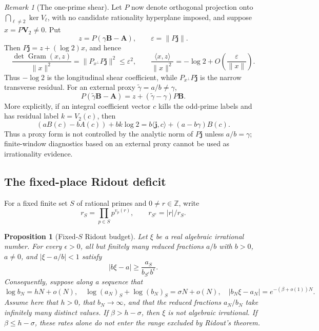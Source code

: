 \documentclass[11pt]{article}
\theoremstyle{keio}
\newtheorem{proposition}[theorem]{Proposition}
\theoremstyle{definition}
\theoremstyle{remark}
\newtheorem{remark}[theorem]{Remark}
\newcommand{\Z}{\mathbb Z}
\begin{document}
\begin{remark}[The one-prime shear]
Let \(P\) now denote orthogonal projection onto
\(\bigcap_{\ell\ne2}\ker V_\ell\), with no candidate rationality
hyperplane imposed, and suppose \(x=P\mathbf V_2\ne0\).  Put
\[
 z=P(\gamma\mathbf B-\mathbf A),
 \qquad \varepsilon=\|P\mathbf j\|.
\]
Then \(P\mathbf j=z+(\log2)x\), and hence
\begin{equation}\label{eq:log2-shear}
 \frac{\det\operatorname{Gram}(x,z)}{\|x\|^2}
 =\|P_{x^\perp}P\mathbf j\|^2\le\varepsilon^2,
 \qquad
 \frac{\langle x,z\rangle}{\|x\|^2}
 =-\log2+O\!\left(\frac\varepsilon{\|x\|}\right).
\end{equation}
Thus \(-\log2\) is the longitudinal shear coefficient, while
\(P_{x^\perp}P\mathbf j\) is the narrow transverse residual.  For an
external proxy \(\widetilde\gamma=a/b\ne\gamma\),
\[
 P(\widetilde\gamma\mathbf B-\mathbf A)
 =z+(\widetilde\gamma-\gamma)P\mathbf B.
\]
More explicitly, if an integral coefficient vector \(c\) kills the
odd-prime labels and has residual label \(k=V_2(c)\), then
\[
 (aB(c)-bA(c))+bk\log2
 =b\langle\mathbf j,c\rangle+(a-b\gamma)B(c).
\]
Thus a proxy form is not controlled by the analytic norm of \(P\mathbf j\)
unless \(a/b=\gamma\); finite-window diagnostics based on an external proxy
cannot be used as irrationality evidence.
\end{remark}

\subsection{The fixed-place Ridout deficit}

For a fixed finite set \(S\) of rational primes and \(0\ne r\in\Z\), write
\[
 r_S=\prod_{p\in S}p^{v_p(r)},
 \qquad r_{S^c}=|r|/r_S.
\]

\begin{proposition}[Fixed-\(S\) Ridout budget]
\label{prop:ridout-budget}
Let \(\xi\) be a real algebraic irrational number.  For every
\(\epsilon>0\), all but finitely many reduced fractions \(a/b\) with
\(b>0\), \(a\ne0\), and \(|\xi-a/b|<1\) satisfy
\begin{equation}\label{eq:ridout-linear-form}
 |b\xi-a|\ge\frac{a_S}{b_{S^c}b^\epsilon}.
\end{equation}
Consequently, suppose along a sequence that
\[
 \log b_N=hN+o(N),
 \quad
 \log(a_N)_S+\log(b_N)_S=\sigma N+o(N),
 \quad
 |b_N\xi-a_N|=e^{-(\beta+o(1))N}.
\]
Assume here that \(h>0\), that \(b_N\to\infty\), and that the reduced
fractions \(a_N/b_N\) take infinitely many distinct values.
If \(\beta>h-\sigma\), then \(\xi\) is not algebraic irrational.  If
\(\beta\le h-\sigma\), these rates alone do not enter the range excluded by
Ridout's theorem.
\end{proposition}
\end{document}
